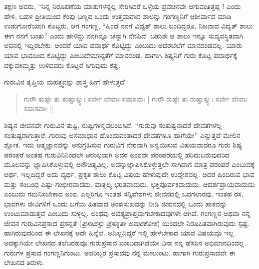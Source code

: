 {ತಕ್ಷಣ ಅವರು, “ನಿನ್ನ ನಿರೂಪಣೆಯ ಮಾತುಗಳನ್ನೆಲ್ಲ ಸೇರಿಸಿದರೆ ಒಳ್ಳೆಯ ಪ್ರವಚನವೇ ಆಗುವಂತಿತ್ತಪ್ಪ ! ಎಂದು ಹೇಳಿ, ಬಹಳ ಪ್ರೀತಿಯಿಂದ ಕೆಂಪು ಬಣ್ಣದ ಒಂದು ಉತ್ತಮವಾದ ಶಾಲನ್ನು ಗಂಗಣ್ಣನಿಗೆ ಆಶೀರ್ವಾದ ಮಾಡಿ ಉಡುಗೋರೆಯಾಗಿ ಕೊಟ್ಟರು. ಆಗ ಗಂಗಣ್ಣ, “ಹಿಂದೆ ನನಗೆ ವಿದ್ವತ್ ಶಾಲು ಬಂದಿದ್ದರೂ, ನಿಜವಾದ ವಿದ್ವತ್ ಶಾಲು ಈಗ ನನಗೆ ಬಂತು” ಎಂದು ಹೇಳಿದ್ದು ನನಗಿನ್ನೂ ಚೆನ್ನಾಗಿ ನೆನಪಿದೆ. ಬಹುಶಃ ಆ ಶಾಲು ಇನ್ನೂ ಸುವ್ಯವಸ್ಥಿತವಾಗಿ ಅವನಲ್ಲಿ ಇದ್ದಿರಬೇಕು. ಅಂದರೆ ಯಾವ ಪದಾರ್ಥ ಕೊಟ್ಟಿದ್ದು ಎಂಬುದು ಅದರ\break ಬೆಲೆಗೆ ಮಾನದಂಡವಲ್ಲ. ಯಾರು ಯಾವ ಭಾವದಿಂದ ಕೊಟ್ಟಿದ್ದು ಎಂಬುದೇ\break ಮಾನ್ಯತೆಗೆ ಮಾನದಂಡ. ಹಾಗಾಗಿ ಶಿಷ್ಯನಿಗೆ ಗುರು ಕೊಟ್ಟ ಪದಾರ್ಥಕ್ಕೆ ದಕ್ಕುವ\break ಕಿಮ್ಮತ್ತು ಉಳಿದವರು ಕೊಟ್ಟರೆ ಸಿಗುವುದು ಕಷ್ಟ. 

ಗುರುವಿನ ತೃಪ್ತಿಯ ಮಹತ್ತ್ವವನ್ನು ಶಾಸ್ತ್ರ ಹೀಗೆ ಹೇಳುತ್ತದೆ \enginline{-} 
\begin{verse}
ಗುರೌ ತುಷ್ಟೇ ತು ತುಷ್ಟಾಸ್ಸ್ಯುಃ ಸರ್ವೇ ದೇವಾಃ ಸವಾಸವಾಃ | 
ಗುರೌ ರುಷ್ಟೇ ತು ರುಷ್ಟಾಸ್ಸ್ಯುಃ ಸರ್ವೇ ದೇವಾಃ ಸವಾಸವಾಃ ||
\end{verse}
ಶಿಷ್ಯನ ಜೀವನವೇ ಗುರುವಿನ ತುಷ್ಟಿ, ರುಷ್ಟಿಗಳನ್ನವಲಂಬಿಸಿದೆ. “ಗುರುವು ಸಂತುಷ್ಟ\-ನಾದರೆ ದೇವತೆಗಳೆಲ್ಲ ಸಂತುಷ್ಟರಾಗುತ್ತಾರೆ, ಗುರುವು ಅಸಮಾಧಾನ ಹೊಂದುವಂತಾ\-ದರೆ ದೇವತೆಗಳೂ ಹಾಗೆಯೇ” ಎನ್ನುತ್ತದೆ ಮೇಲಿನ ಶ್ಲೋಕ. ಇದು ಆತ್ಮಜ್ಞಾನವನ್ನು ಅನುಗ್ರಹಿಸುವ ಗುರುವಿಗೆ ನೇರವಾಗಿ ಅನ್ವಯಿಸುವ ವಿಷಯವಾದರೂ ಗುರು ಶಿಷ್ಯ ಪರಂಪರೆ ಅಂತಹ ಗುರುವಿನಿನಿಂದಲೇ ಆರಂಭವಾಗಿ ಅದರ ಅಂಶವೇ ಪರಂಪರೆಯಲ್ಲಿ ಹರಿದುಬರುವುದರಿದ  ಮೂಲವನ್ನು ಜ್ಞಾಪಿಸಿಕೊಳ್ಳುವಲ್ಲಿ ಅನೌಚಿತ್ಯವಿಲ್ಲ. ಅದನ್ನು\break ಜ್ಞಾಪಿಸಿಕೊಳ್ಳುತ್ತಲೇ ಸಾಗಿದಾಗ ಮಾತ್ರ ಪರಂಪರೆ ಎಂಬುದಕ್ಕೆ ಅರ್ಥ, ಇಲ್ಲದಿದ್ದರೆ ಅದು ವ್ಯರ್ಥ,  ಪ್ರಕೃತ ಶಾಲು ಕೊಟ್ಟ ವಿಷಯ ಹೇಳುವುದೇ ಉದ್ದೇಶವಲ್ಲ. ಅದರ ಹಿಂದಿರುವ ಭಾವ ಮತ್ತು ಸಂಬಂಧ ಎಷ್ಟು ಗಂಭೀರವಾದದು, ವಾತ್ಸಲ್ಯ ಭರಿತ\-ವಾದುದು, ಭಕ್ತಿ\-ಪೂರ್ವಕವಾದುದು, ಆದರ್ಶಪ್ರಾಯವಾದುದು ಎಂಬುದು ಗಮನಿಸಬೇಕಾದ ಅಂಶ. ಎಲ್ಲರಿಗೂ ಇಂತಹ ಸನ್ನಿವೇಶಗಳು ಜೀವನದಲ್ಲಿ ಒದಗಲಾರವು. ಇಂತಹ ರಸ, ಭಾವಗಳು ಜೀವಿಗಳಿಗೆ ಒಂದು ಬಗೆಯ ಹಿತವಾದ ಅಂತಃಸುಖವನ್ನು ನೀಡಿ  ಜೀವನದಲ್ಲಿ ಒಂದು ಪಾಕವನ್ನು ಉಂಟುಮಾಡುತ್ತವೆ ಎಂಬುದು ಸುಳ್ಳಲ್ಲ. ಅಂಥವು ಅವಶ್ಯ\break ಪ್ರಾಪ್ತವಾಗಬೇಕಾದವುಗಳೇ ಆಗಿವೆ. ಗಂಗಣ್ಣನ ಅಥವಾ ನನ್ನ ಜೀವನ ಗುರುವಿನ\break ಪ್ರಸಾದ \enginline{-} ಪ್ರಸನ್ನತೆ (\textit{ಪ್ರಸಾದಸ್ತು ಪ್ರಸನ್ನತಾ \enginline{-} ಅಮರಕೋಶ}) ಯಿಂದಲೇ ನಿರೂಪಿತ\-ವಾಗಿರು\-ವುದು ಸ್ಪಷ್ಟ. ಹಾಗಿರುವುದರಿಂದ ಈ ಲೇಖನಕ್ಕೆ ಅದೇ ಹಿನ್ನೆಲೆ. ಅದಿಲ್ಲದಿದ್ದರೆ ಇಲ್ಲಿ ಹೇಳಬೇಕಾದ ಯಾವ ವಿಷಯವೂ ಇಲ್ಲ. ಅದಕ್ಕಾಗಿಯೇ ಲೇಖನದ ತಲೆ\-ಬರಹವೂ ಗುರುಪ್ರಸಾದ ಎಂಬುದಾಗಿದೆಯೇ ವಿನಾ ನನ್ನ ಹೆಸರಿನ ಅಭಿಮಾನದಿಂದಲ್ಲ. ಗುರುಗಳ ಪ್ರಸಾದ ಗಂಗಣ್ಣನಿಗುಂಟು. ಅವರಿಬ್ಬರ ಪ್ರಸಾದವು ನನ್ನ ಮೇಲುಂಟು. ಹಾಗಾಗಿ ಗುರು\enginline{-}ಪ್ರಸಾದವೇ ಈ ಲೇಖನದ ತಿರುಳು. 

}
